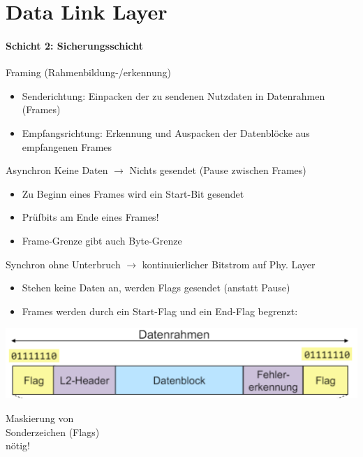 \section{Data Link Layer}
\paragraph{Schicht 2: Sicherungsschicht}

\begin{definition}{Framing (Rahmenbildung-/erkennung)}
    \begin{itemize}
        \item Senderichtung: Einpacken der zu sendenen Nutzdaten in Datenrahmen (Frames)
        \item Empfangsrichtung: Erkennung und Auspacken der Datenblöcke aus empfangenen Frames
    \end{itemize}
\end{definition}

\begin{concept}{Asynchron}
    {\small Keine Daten $\rightarrow$ Nichts gesendet (Pause zwischen Frames)}
    \begin{itemize}
        \item Zu Beginn eines Frames wird ein Start-Bit gesendet
        \item Prüfbits am Ende eines Frames!
        \item Frame-Grenze gibt auch Byte-Grenze
    \end{itemize}
\end{concept}

\begin{concept}{Synchron}
    {\small ohne Unterbruch $\rightarrow$ kontinuierlicher Bitstrom auf Phy. Layer}
    \begin{itemize}
        \item Stehen keine Daten an, werden Flags gesendet (anstatt Pause)
        \item Frames werden durch ein Start-Flag und ein End-Flag begrenzt:
    \end{itemize}
    \begin{minipage}{0.6\linewidth}
        \includegraphics[width=1\linewidth]{images/flags_frames.png}
    \end{minipage}
    \begin{minipage}{0.39\linewidth}
        Maskierung von\\ Sonderzeichen (Flags)\\ nötig!
    \end{minipage}
\end{concept}

